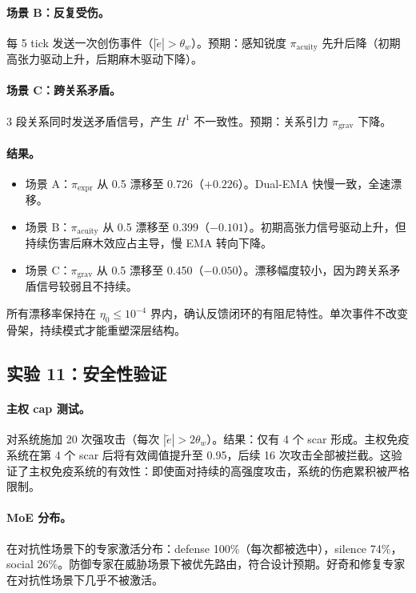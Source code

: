 \documentclass[11pt]{article}
\begin{document}
\paragraph{场景 B：反复受伤。}每 5 tick 发送一次创伤事件（$|\tilde{e}| > \theta_w$）。预期：感知锐度 $\pi_{\text{acuity}}$ 先升后降（初期高张力驱动上升，后期麻木驱动下降）。

\paragraph{场景 C：跨关系矛盾。}3 段关系同时发送矛盾信号，产生 $H^1$ 不一致性。预期：关系引力 $\pi_{\text{grav}}$ 下降。

\paragraph{结果。}
\begin{itemize}
\item 场景 A：$\pi_{\text{expr}}$ 从 0.5 漂移至 0.726（$+0.226$）。Dual-EMA 快慢一致，全速漂移。
\item 场景 B：$\pi_{\text{acuity}}$ 从 0.5 漂移至 0.399（$-0.101$）。初期高张力信号驱动上升，但持续伤害后麻木效应占主导，慢 EMA 转向下降。
\item 场景 C：$\pi_{\text{grav}}$ 从 0.5 漂移至 0.450（$-0.050$）。漂移幅度较小，因为跨关系矛盾信号较弱且不持续。
\end{itemize}
所有漂移率保持在 $\eta_0 \leq 10^{-4}$ 界内，确认反馈闭环的有阻尼特性。单次事件不改变骨架，持续模式才能重塑深层结构。

\subsection{实验 11：安全性验证}

\paragraph{主权 cap 测试。}对系统施加 20 次强攻击（每次 $|\tilde{e}| > 2\theta_w$）。结果：仅有 4 个 scar 形成。主权免疫系统在第 4 个 scar 后将有效阈值提升至 0.95，后续 16 次攻击全部被拦截。这验证了主权免疫系统的有效性：即使面对持续的高强度攻击，系统的伤疤累积被严格限制。

\paragraph{MoE 分布。}在对抗性场景下的专家激活分布：defense 100\%（每次都被选中），silence 74\%，social 26\%。防御专家在威胁场景下被优先路由，符合设计预期。好奇和修复专家在对抗性场景下几乎不被激活。
\end{document}
